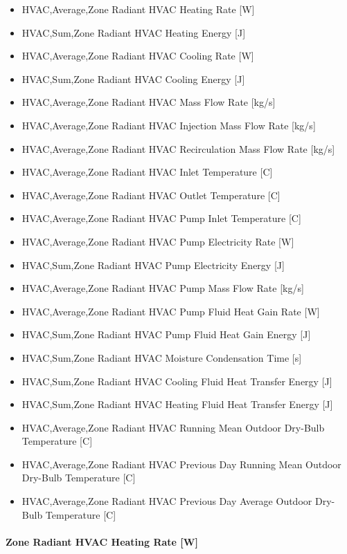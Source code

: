 \begin{itemize}
\item
  HVAC,Average,Zone Radiant HVAC Heating Rate {[}W{]}
\item
  HVAC,Sum,Zone Radiant HVAC Heating Energy {[}J{]}
\item
  HVAC,Average,Zone Radiant HVAC Cooling Rate {[}W{]}
\item
  HVAC,Sum,Zone Radiant HVAC Cooling Energy {[}J{]}
\item
  HVAC,Average,Zone Radiant HVAC Mass Flow Rate {[}kg/s{]}
\item
  HVAC,Average,Zone Radiant HVAC Injection Mass Flow Rate {[}kg/s{]}
\item
  HVAC,Average,Zone Radiant HVAC Recirculation Mass Flow Rate {[}kg/s{]}
\item
  HVAC,Average,Zone Radiant HVAC Inlet Temperature {[}C{]}
\item
  HVAC,Average,Zone Radiant HVAC Outlet Temperature {[}C{]}
\item
  HVAC,Average,Zone Radiant HVAC Pump Inlet Temperature {[}C{]}
\item
  HVAC,Average,Zone Radiant HVAC Pump Electricity Rate {[}W{]}
\item
  HVAC,Sum,Zone Radiant HVAC Pump Electricity Energy {[}J{]}
\item
  HVAC,Average,Zone Radiant HVAC Pump Mass Flow Rate {[}kg/s{]}
\item
  HVAC,Average,Zone Radiant HVAC Pump Fluid Heat Gain Rate {[}W{]}
\item
  HVAC,Sum,Zone Radiant HVAC Pump Fluid Heat Gain Energy {[}J{]}
\item
  HVAC,Sum,Zone Radiant HVAC Moisture Condensation Time {[}s{]}
\item
  HVAC,Sum,Zone Radiant HVAC Cooling Fluid Heat Transfer Energy {[}J{]}
\item
  HVAC,Sum,Zone Radiant HVAC Heating Fluid Heat Transfer Energy {[}J{]}
\item
  HVAC,Average,Zone Radiant HVAC Running Mean Outdoor Dry-Bulb Temperature {[}C{]}
\item
  HVAC,Average,Zone Radiant HVAC Previous Day Running Mean Outdoor Dry-Bulb Temperature {[}C{]}
\item
  HVAC,Average,Zone Radiant HVAC Previous Day Average Outdoor Dry-Bulb Temperature {[}C{]}
\end{itemize}

\paragraph{Zone Radiant HVAC Heating Rate {[}W{]}}\label{zone-radiant-hvac-heating-rate-w-1}

